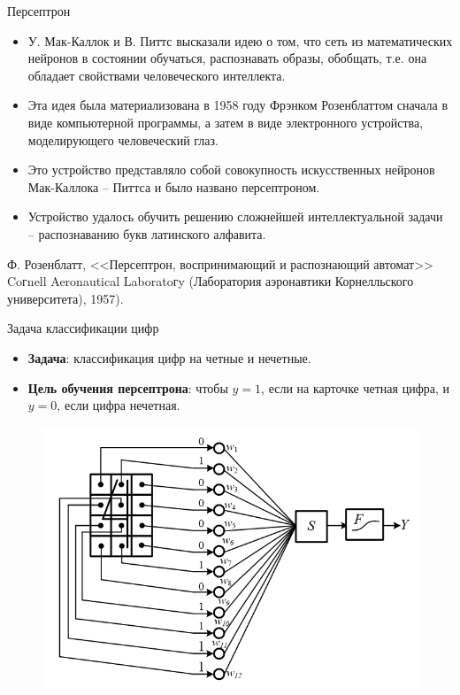 \documentclass{beamer}
\begin{document}
\begin{frame}{Персептрон}
	\linespread{1.0}
	\begin{itemize}
		\item У. Мак-Каллок и В. Питтс высказали идею о том, что сеть из математических нейронов в состоянии обучаться, распознавать образы, обобщать, т.е. она обладает свойствами человеческого интеллекта.	
		\item Эта идея была материализована в 1958 году Фрэнком Розенблаттом сначала в виде компьютерной программы, а затем в виде электронного устройства, моделирующего человеческий глаз.
		\item Это устройство представляло собой совокупность искусственных нейронов Мак-Каллока – Питтса и было названо персептроном. 
		\item Устройство удалось обучить решению сложнейшей интеллектуальной задачи – распознаванию букв латинского алфавита.
	\end{itemize}		

	Ф. Розенблатт, <<Персептрон, воспринимающий и распознающий автомат>> Coгnell Aeronautical Laboratoгy (Лаборатория аэронавтики Корнелльского университета), 1957).
	\linespread{0.8}	
\end{frame}

\begin{frame}{Задача классификации цифр}
	\begin{itemize}
		\item \textbf{Задача}: классификация цифр на четные и нечетные.
		\item \textbf{Цель обучения персептрона}: чтобы $y=1$, если на карточке четная цифра, и $y=0$, если цифра нечетная.		
	\end{itemize}
	\begin{figure}[h]
		\centering
		\includegraphics[scale=0.5]{images/lec03-binary.png}
	\end{figure}
\end{frame}
\end{document}
